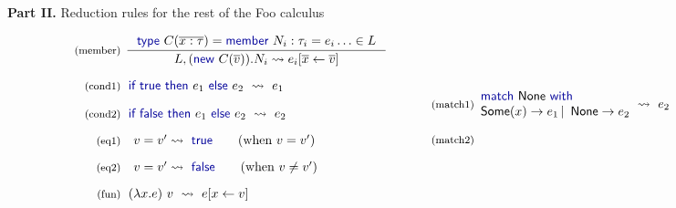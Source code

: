 \documentclass[pldi-cameraready]{sigplanconf-pldi16}
\newcommand{\kvd}[1]{\textnormal{\textcolor{kvdclr}{\sffamily #1}}}
\newcommand{\ident}[1]{\textnormal{\sffamily #1}}
\newcommand{\reduce}{\rightsquigarrow}
\begin{document}
\begin{figure}
\noindent
\begin{center}
\textbf{Part II.} Reduction rules for the rest of the Foo calculus
\end{center}

\vspace{0.5em}
\noindent
\begin{equation*}
\begin{array}{rl}
 \textnormal{\footnotesize{(member)}}&
 \hspace{-0.6em}
 \inference
 { \kvd{type}~C(\overline{x:\tau})= \kvd{member}~N_i : \tau_i = e_i \ldots \in L }
 { L, (\kvd{new}~C(\overline{v})).N_i \reduce e_i[\overline{x} \leftarrow \overline{v}] }\\
 \\[-0.2em]
 \textnormal{\footnotesize{(cond1)}}&
 \hspace{-0.4em}
 \kvd{if}~\kvd{true}~\kvd{then}~e_1~\kvd{else}~e_2 ~\reduce~ e_1 \\
 \\[-0.2em]
 \textnormal{\footnotesize{(cond2)}}&
 \hspace{-0.4em}
 \kvd{if}~\kvd{false}~\kvd{then}~e_1~\kvd{else}~e_2 ~\reduce~ e_2 \\
 \\[-0.3em]
 \textnormal{\footnotesize{(eq1)}}&
 v=v'\reduce\kvd{true} \qquad (\textnormal{when}~v = v')\\
 \\[-0.3em]
 \textnormal{\footnotesize{(eq2)}}&
 v=v'\reduce\kvd{false} \qquad (\textnormal{when}~v \neq v')\\
 \\[-0.3em]
 \textnormal{\footnotesize{(fun)}}&
 \hspace{-0.4em}
 (\lambda x.e)~v ~\reduce~ e[x\leftarrow v] \\
\end{array}
\quad
\begin{array}{rl}
 \textnormal{\footnotesize{(match1)}}&
 \hspace{-1em}
 \begin{array}{l}
  \kvd{match}~\ident{None}~\kvd{with} \\
  \ident{Some}(x) \rightarrow e_1 \,|\, \ident{None} \rightarrow e_2
 \end{array} \hspace{-0.5em} ~\reduce~ e_2 \\
 \\[-0.2em]
 \textnormal{\footnotesize{(match2)}}&
 \hspace{-1em}
 \begin{array}{l}

\end{array}
\end{array}
\end{equation*}
\end{figure}
\end{document}
